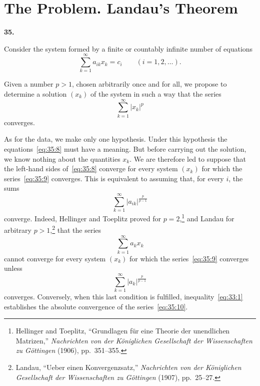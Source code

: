 \documentclass[
  paper=b5,
  fontsize=13pt,
  twoside=true,
  open=any,
  bookmarkpackage=false,
  chapterprefix=true,
  headings=normal
]{scrbook}
\theoremstyle{definition}
\newcommand{\numberedparagraph}[1]{%
  \par\medskip\phantomsection\label{sec:#1}%
  \noindent\textbf{#1.}\enspace
}
\begin{document}
\section{The Problem. Landau's Theorem}

\numberedparagraph{35}
Consider the system formed by a finite or countably infinite number of equations
\begin{equation}
 \sum_{k=1}^{\infty}a_{ik}x_k=c_i
 \qquad(i=1,2,\ldots).
 \tag{8}\label{eq:35:8}
\end{equation}

Given a number $p>1$, chosen arbitrarily once and for all, we propose to determine a solution $(x_k)$ of the system in such a way that the series
\begin{equation}
 \sum_{k=1}^{\infty}|x_k|^p
 \tag{9}\label{eq:35:9}
\end{equation}
converges.

As for the data, we make only one hypothesis. Under this hypothesis the equations~\eqref{eq:35:8} must have a meaning. But before carrying out the solution, we know nothing about the quantities $x_k$. We are therefore led to suppose that the left-hand sides of~\eqref{eq:35:8} converge for every system $(x_k)$ for which the series~\eqref{eq:35:9} converges. This is equivalent to assuming that, for every $i$, the sums
\[
 \sum_{k=1}^{\infty}|a_{ik}|^{\frac{p}{p-1}}
\]
converge. Indeed, Hellinger and Toeplitz proved for $p=2$,\footnote{Hellinger and Toeplitz, ``Grundlagen f\"ur eine Theorie der unendlichen Matrizen,'' \emph{Nachrichten von der K\"oniglichen Gesellschaft der Wissenschaften zu G\"ottingen} (1906), pp.~351--355.} and Landau for arbitrary $p>1$,\footnote{Landau, ``Ueber einen Konvergenzsatz,'' \emph{Nachrichten von der K\"oniglichen Gesellschaft der Wissenschaften zu G\"ottingen} (1907), pp.~25--27.} that the series
\begin{equation}
 \sum_{k=1}^{\infty}a_kx_k
 \tag{10}\label{eq:35:10}
\end{equation}
cannot converge for every system $(x_k)$ for which the series~\eqref{eq:35:9} converges unless
\begin{equation}
 \sum_{k=1}^{\infty}|a_k|^{\frac{p}{p-1}}
 \tag{11}\label{eq:35:11}
\end{equation}
converges. Conversely, when this last condition is fulfilled, inequality~\eqref{eq:33:1} establishes the absolute convergence of the series~\eqref{eq:35:10}.
\end{document}
